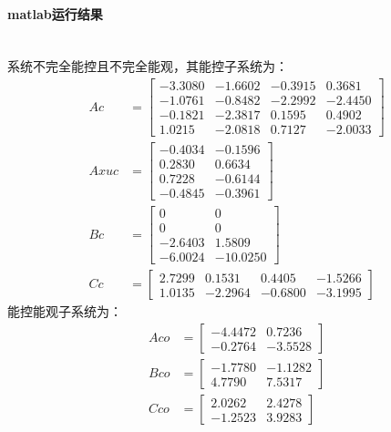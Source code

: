 \documentclass[UTF8]{article}
\begin{document}
\paragraph{matlab运行结果}~{}
\\
系统不完全能控且不完全能观，其能控子系统为：
\begin{align*}
    Ac &=    
    \begin{bmatrix}
        -3.3080 & -1.6602 & -0.3915 & 0.3681 \\
        -1.0761 & -0.8482 & -2.2992 & -2.4450 \\
        -0.1821 & -2.3817 & 0.1595 & 0.4902 \\
        1.0215 & -2.0818 & 0.7127 & -2.0033        
    \end{bmatrix} \\
    Axuc &= 
    \begin{bmatrix}
        -0.4034 & -0.1596 \\
        0.2830 & 0.6634 \\
        0.7228 & -0.6144 \\
        -0.4845 & -0.3961
    \end{bmatrix} \\
    Bc &= 
    \begin{bmatrix}
        0 & 0 \\
        0 & 0 \\ 
        -2.6403 & 1.5809 \\
        -6.0024 & -10.0250
    \end{bmatrix} \\
    Cc &= 
    \begin{bmatrix}
        2.7299 & 0.1531 & 0.4405 & -1.5266 \\
        1.0135 & -2.2964 & -0.6800 & -3.1995
    \end{bmatrix}
\end{align*}
能控能观子系统为：
\begin{align*}
    Aco &= 
    \begin{bmatrix} 
        -4.4472 & 0.7236 \\
        -0.2764 & -3.5528
    \end{bmatrix} \\
    Bco &= 
    \begin{bmatrix} 
        -1.7780 & -1.1282 \\
        4.7790 & 7.5317
    \end{bmatrix} \\
    Cco &= 
    \begin{bmatrix} 
        2.0262 & 2.4278 \\
        -1.2523 & 3.9283     
    \end{bmatrix} 
\end{align*}
\end{document}
